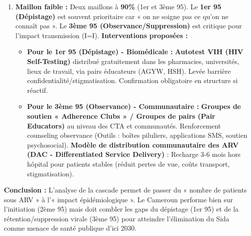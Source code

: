 \documentclass[11pt]{article}
\begin{document}
\begin{exoresolu}
\begin{enumerate}
    \textbf{Interprétation :} Seuls $\sim 77\%$ des PVVIH camerounais sont viralement supprimés. $\sim 23\%$ (62 000 personnes) ont une CV détectable $\rightarrow$ Risque transmission, morbidité, mortalité.
    \item \textbf{Maillon faible :} Deux maillons à \textbf{90\%} (1er et 3ème 95). Le \textbf{1er 95 (Dépistage)} est souvent prioritaire car « on ne soigne pas ce qu'on ne connaît pas ». Le \textbf{3ème 95 (Observance/Suppression)} est critique pour l'impact transmission (I=I).
    \textbf{Interventions proposées :}
    \begin{itemize}
        \item \textbf{Pour le 1er 95 (Dépistage) - Biomédicale :} \textbf{Autotest VIH (HIV Self-Testing)} distribué gratuitement dans les pharmacies, universités, lieux de travail, via pairs éducateurs (AGYW, HSH). Levée barrière confidentialité/stigmatisation. Confirmation obligatoire en structure si réactif.
        \item \textbf{Pour le 3ème 95 (Observance) - Communautaire :} \textbf{Groupes de soutien « Adherence Clubs » / Groupes de pairs (Pair Educators)} au niveau des CTA et communautés. Renforcement counseling observance (Outils : boîtes piluliers, applications SMS, soutien psychosocial). \textbf{Modèle de distribution communautaire des ARV (DAC - Differentiated Service Delivery)} : Recharge 3-6 mois hors hôpital pour patients stables (réduit pertes de vue, coûts transport, stigmatisation).
    \end{itemize}
\end{enumerate}
\textbf{Conclusion :} L'analyse de la cascade permet de passer du « nombre de patients sous ARV » à l'« impact épidémiologique ». Le Cameroun performe bien sur l'initiation (2ème 95) mais doit combler les gaps du dépistage (1er 95) et de la rétention/suppression virale (3ème 95) pour atteindre l'élimination du Sida comme menace de santé publique d'ici 2030.
\end{exoresolu}
\end{document}

